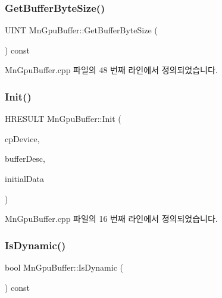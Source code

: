 \subsubsection{\texorpdfstring{Get\+Buffer\+Byte\+Size()}{GetBufferByteSize()}}
{\footnotesize\ttfamily U\+I\+NT Mn\+Gpu\+Buffer\+::\+Get\+Buffer\+Byte\+Size (\begin{DoxyParamCaption}{ }\end{DoxyParamCaption}) const}



Mn\+Gpu\+Buffer.\+cpp 파일의 48 번째 라인에서 정의되었습니다.

\mbox{\label{class_m_n_l_1_1_mn_gpu_buffer_a00bd28801336391d28e6d91e99a8bef3}} 
\subsubsection{\texorpdfstring{Init()}{Init()}}
{\footnotesize\ttfamily H\+R\+E\+S\+U\+LT Mn\+Gpu\+Buffer\+::\+Init (\begin{DoxyParamCaption}\item[{const \hyperlink{namespace_m_n_l_a1eec210db8f309a4a9ac0d9658784c31}{C\+P\+D3\+D\+Device} \&}]{cp\+Device,  }\item[{const D3\+D11\+\_\+\+B\+U\+F\+F\+E\+R\+\_\+\+D\+E\+SC \&}]{buffer\+Desc,  }\item[{const D3\+D11\+\_\+\+S\+U\+B\+R\+E\+S\+O\+U\+R\+C\+E\+\_\+\+D\+A\+TA $\ast$}]{initial\+Data }\end{DoxyParamCaption})}



Mn\+Gpu\+Buffer.\+cpp 파일의 16 번째 라인에서 정의되었습니다.

\mbox{\label{class_m_n_l_1_1_mn_gpu_buffer_a617ce607255f345962df39eec00e9593}} 
\subsubsection{\texorpdfstring{Is\+Dynamic()}{IsDynamic()}}
{\footnotesize\ttfamily bool Mn\+Gpu\+Buffer\+::\+Is\+Dynamic (\begin{DoxyParamCaption}{ }\end{DoxyParamCaption}) const}



